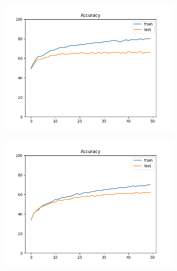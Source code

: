 \documentclass[12pt]{article}
\begin{document}
\begin{figure}
\begin{subfigure}{0.19\textwidth}
  \end{subfigure}
  \begin{subfigure}{0.19\textwidth}
    \centering
    \includegraphics[width=\linewidth]{accuracies_2_3_bs4.png}
  \end{subfigure}
  \begin{subfigure}{0.19\textwidth}
    \centering
    \includegraphics[width=\linewidth]{accuracies_3_lr1e-4.png}
  \end{subfigure}
  \begin{subfigure}{0.19\textwidth}
    \centering

\end{subfigure}
\end{figure}
\end{document}
